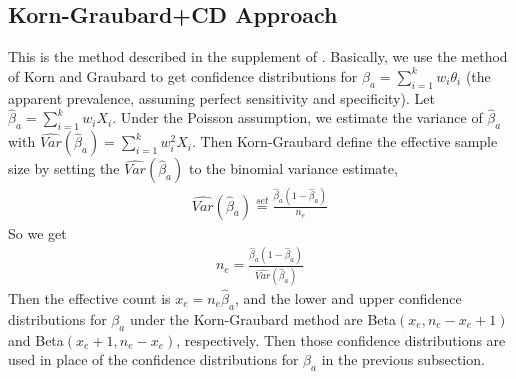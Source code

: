 \documentclass{article}
\begin{document}
\subsection{Korn-Graubard+CD Approach} 

This is the method described in the supplement of \citet{Kali:2021}.
Basically, we use the method of Korn and Graubard to get confidence distributions for ${\beta}_a = \sum_{i=1}^{k} w_i \theta_i$ (the apparent prevalence, assuming perfect sensitivity and specificity).
Let $\hat{\beta}_a= \sum_{i=1}^{k} w_i X_i$. Under the Poisson assumption, we estimate the variance 
of $\hat{\beta}_a$ with $\widehat{Var}(\hat{\beta}_a) = \sum_{i=1}^{k} w_i^2 X_i$. Then Korn-Graubard define the effective sample size by setting the $\widehat{Var}(\hat{\beta}_a)$ to the binomial variance estimate,
\begin{eqnarray*}
\widehat{Var}(\hat{\beta}_a) \stackrel{set}{=} \frac{\hat{\beta}_a (1-\hat{\beta}_a)}{n_e}
\end{eqnarray*}
So we get 
\begin{eqnarray*}
n_e =   \frac{\hat{\beta}_a (1-\hat{\beta}_a)}{\widehat{Var}(\hat{\beta}_a)}
\end{eqnarray*}
Then the effective count is $x_e = n_e \hat{\beta}_a$, and the lower and upper confidence distributions for ${\beta}_a$ under the Korn-Graubard method are Beta$(x_e, n_e-x_e+1)$ and Beta$(x_e+1,n_e-x_e)$, respectively. 
Then those confidence distributions are used in place of the confidence distributions for $\beta_a$ in the previous subsection. 



%




\end{document}

